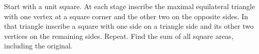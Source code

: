 Start with a unit square. At each stage inscribe the maximal equilateral triangle with one vertex at a square corner and the other two on the opposite sides. In that triangle inscribe a square with one side on a triangle side and its other two vertices on the remaining sides. Repeat. Find the sum of all square areas, including the original.
